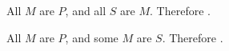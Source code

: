 \begin{exercises} 
 
\item All $M$ are $P$, and all $S$ are $M$. Therefore \underline{\hspace{2cm}}.

\item All $M$ are $P$, and some $M$ are $S$. Therefore \underline{\hspace{2cm}}. 


\end{exercises}
